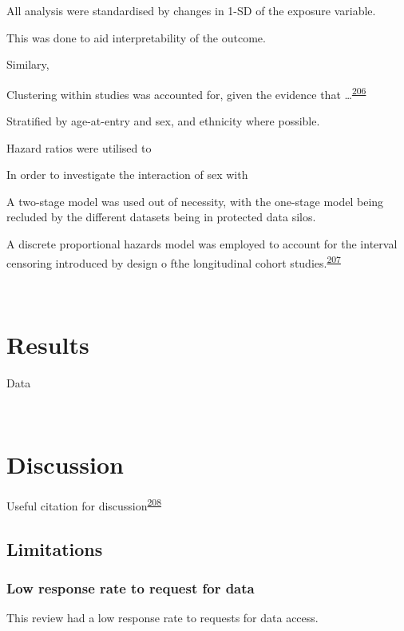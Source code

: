 \documentclass[a4paper, twoside]{templates/ociamthesis}
\begin{document}
All analysis were standardised by changes in 1-SD of the exposure variable.

This was done to aid interpretability of the outcome.

Similary,

Clustering within studies was accounted for, given the evidence that \ldots{}\textsuperscript{\protect\hyperlink{ref-abo-zaid2013}{206}}

Stratified by age-at-entry and sex, and ethnicity where possible.

Hazard ratios were utilised to

In order to investigate the interaction of sex with

A two-stage model was used out of necessity, with the one-stage model being recluded by the different datasets being in protected data silos.

A discrete proportional hazards model was employed to account for the interval censoring introduced by design o fthe longitudinal cohort studies.\textsuperscript{\protect\hyperlink{ref-wang2017}{207}}

~

\hypertarget{results-2}{%
\section{Results}\label{results-2}}

Data

~

\hypertarget{discussion-3}{%
\section{Discussion}\label{discussion-3}}

Useful citation for discussion\textsuperscript{\protect\hyperlink{ref-levis2021}{208}}

\hypertarget{limitations-1}{%
\subsection{Limitations}\label{limitations-1}}

\hypertarget{low-response-rate-to-request-for-data}{%
\subsubsection{Low response rate to request for data}\label{low-response-rate-to-request-for-data}}

This review had a low response rate to requests for data access.
\end{document}
